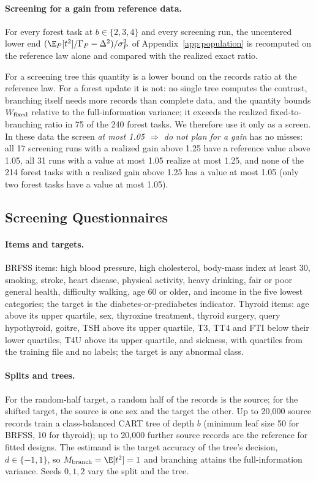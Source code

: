 \paragraph{Screening for a gain from reference data.}
For every forest task at $b\in\{2,3,4\}$ and every screening run, the uncentered lower end $(\E_P[t^2]/\Gamma_P-\Delta^2)/\sigma_P^2$ of Appendix~\ref{app:population} is recomputed on the reference law alone and compared with the realized exact ratio.

For a screening tree this quantity is a lower bound on the records ratio at the reference law. For a forest update it is not: no single tree computes the contrast, branching itself needs more records than complete data, and the quantity bounds $W_{\rm fixed}$ relative to the full-information variance; it exceeds the realized fixed-to-branching ratio in 75 of the 240 forest tasks. We therefore use it only as a screen. In these data the screen \emph{at most 1.05 $\Rightarrow$ do not plan for a gain} has no misses: all 17 screening runs with a realized gain above 1.25 have a reference value above 1.05, all 31 runs with a value at most 1.05 realize at most 1.25, and none of the 214 forest tasks with a realized gain above 1.25 has a value at most 1.05 (only two forest tasks have a value at most 1.05).

\subsection{Screening Questionnaires}\label{app:screening}\label{app:screendetail}
\paragraph{Items and targets.}
BRFSS items: high blood pressure, high cholesterol, body-mass index at least 30, smoking, stroke, heart disease, physical activity, heavy drinking, fair or poor general health, difficulty walking, age 60 or older, and income in the five lowest categories; the target is the diabetes-or-prediabetes indicator. Thyroid items: age above its upper quartile, sex, thyroxine treatment, thyroid surgery, query hypothyroid, goitre, TSH above its upper quartile, T3, TT4 and FTI below their lower quartiles, T4U above its upper quartile, and sickness, with quartiles from the training file and no labels; the target is any abnormal class.

\paragraph{Splits and trees.}
For the random-half target, a random half of the records is the source; for the shifted target, the source is one sex and the target the other. Up to 20,000 source records train a class-balanced CART tree of depth $b$ (minimum leaf size 50 for BRFSS, 10 for thyroid); up to 20,000 further source records are the reference for fitted designs. The estimand is the target accuracy of the tree's decision, $d\in\{-1,1\}$, so $M_{\rm branch}=\E[t^2]=1$ and branching attains the full-information variance. Seeds $0,1,2$ vary the split and the tree.

